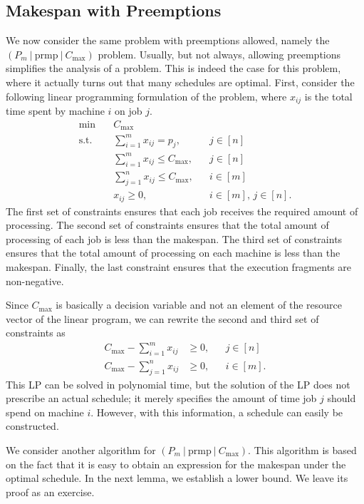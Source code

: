 \subsection{Makespan with Preemptions} \label{subsec:6.2}
We now consider the same problem with preemptions allowed, namely the 
$(P_m~|~\text{prmp}~|~C_{\max})$ problem. Usually, but not always, allowing 
preemptions simplifies the analysis of a problem. This is indeed the case for 
this problem, where it actually turns out that many schedules are optimal. 
First, consider the following linear programming formulation of the problem, 
where $x_{ij}$ is the total time spent by machine $i$ on job $j$. 
\begin{align*}
    \min\quad & C_{\max} \\ 
    \text{s.t.}\quad & \sum_{i=1}^m x_{ij} = p_j, && j \in [n] \\ 
    & \sum_{i=1}^m x_{ij} \leq C_{\max}, && j \in [n] \\
    & \sum_{j=1}^n x_{ij} \leq C_{\max}, && i \in [m] \\
    & x_{ij} \geq 0, && i \in [m],\,j \in [n]. 
\end{align*}
The first set of constraints ensures that each job receives the required 
amount of processing. The second set of constraints ensures that the total 
amount of processing of each job is less than the makespan. The third 
set of constraints ensures that the total amount of processing on each 
machine is less than the makespan. Finally, the last constraint ensures that 
the execution fragments are non-negative. 

Since $C_{\max}$ is basically a decision variable and not an element of 
the resource vector of the linear program, we can rewrite the second and third 
set of constraints as 
\begin{align*}
    C_{\max} - \sum_{i=1}^m x_{ij} &\geq 0, && j \in [n] \\ 
    C_{\max} - \sum_{j=1}^n x_{ij} &\geq 0, && i \in [m]. 
\end{align*}
This LP can be solved in polynomial time, but the solution of the LP does
not prescribe an actual schedule; it merely specifies the amount of time job
$j$ should spend on machine $i$. However, with this information, a schedule can
easily be constructed.

We consider another algorithm for $(P_m~|~\text{prmp}~|~C_{\max})$. This 
algorithm is based on the fact that it is easy to obtain an expression for the
makespan under the optimal schedule. In the next lemma, we establish a lower 
bound. We leave its proof as an exercise. 

